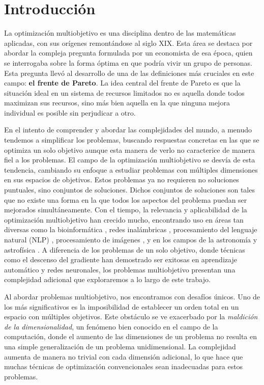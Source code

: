

\chapter{Introducción}


La optimización multiobjetivo es una disciplina dentro de las matemáticas aplicadas, con sus orígenes remontándose al siglo XIX. Esta área se destaca por abordar la compleja pregunta formulada por un economista de esa época, quien se interrogaba sobre la forma óptima en que podría vivir un grupo de personas. Esta pregunta llevó al desarrollo de una de las definiciones más cruciales en este campo: \textbf{el frente de Pareto}. La idea central del frente de Pareto es que la situación ideal en un sistema de recursos limitados no es aquella donde todos maximizan sus recursos, sino más bien aquella en la que ninguna mejora individual es posible sin perjudicar a otro. 

En el intento de comprender y abordar las complejidades del mundo, a menudo tendemos a simplificar los problemas, buscando respuestas concretas en las que se optimiza un solo objetivo aunque esta manera de verlo no caracterice de manera fiel a los problemas. El campo de la optimización multiobjetivo se desvía de esta tendencia, cambiando su enfoque a estudiar problemas con múltiples dimensiones en sus espacios de objetivos. Estos problemas ya no requieren no soluciones puntuales, sino conjuntos de soluciones. Dichos conjuntos de soluciones son tales que no existe una forma en la que todos los aspectos del problema puedan ser mejorados simultáneamente. Con el tiempo, la relevancia y aplicabilidad de la optimización multiobjetivo han crecido mucho, encontrando uso en áreas tan diversas como la bioinformática \cite{handlMultiobjectiveOptimizationBioinformatics2007}, redes inalámbricas \cite{gunjanReviewMultiobjectiveOptimization2023}, procesamiento del lenguaje natural (NLP) \cite{sainiMultiobjectiveOptimizationTechniques2021}, procesamiento de imágenes \cite{aslamComprehensiveSurveyOptimization2020}, y en los campos de la astronomía y astrofísica \cite{mullerUsingMultiobjectiveOptimization2023}. A diferencia de los problemas de un solo objetivo, donde técnicas como el descenso del gradiente han demostrado ser exitosas en aprendizaje automático y redes neuronales, los problemas multiobjetivo presentan una complejidad adicional que exploraremos a lo largo de este trabajo.


Al abordar problemas multiobjetivo, nos encontramos con desafíos únicos. Uno de los más significativos es la imposibilidad de establecer un orden total en un espacio con múltiples objetivos.  Este obstáculo se ve exacerbado por la \emph{maldición de la dimensionalidad}, un fenómeno bien conocido en el campo de la computación, donde el aumento de las dimensiones de un problema no resulta en una simple generalización de un problema unidimensional. La complejidad aumenta de manera no trivial con cada dimensión adicional, lo que hace que muchas técnicas de optimización convencionales sean inadecuadas para estos problemas.

